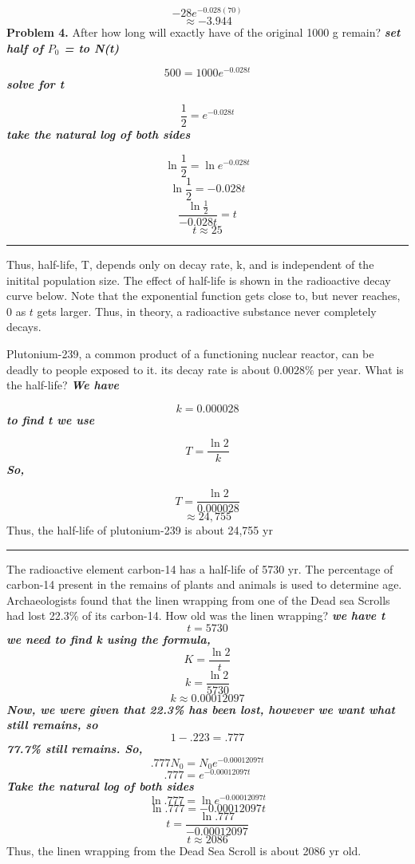 \documentclass{report}
\begin{document}
$$ -28e^{-0.028(70)}$$
$$ \approx -3.944$$
\bigbreak \noindent
\textbf{Problem 4.} After how long will exactly have of the original 1000 g remain?
\bigbreak \noindent
\textit{\textbf{set half of $P_0$ = to N(t)}}

$$ 500 = 1000e^{-0.028t}$$
\textit{\textbf{solve for t}}

$$ \frac{1}{2} = e^{-0.028t}$$
\textit{\textbf{take the natural log of both sides}}

$$ \ln\frac{1}{2} = \ln{e^{-0.028t}}$$
$$ \ln\frac{1}{2} = -0.028t$$
$$ \frac{\ln\frac{1}{2}}{-0.028t} = t$$
$$ t \approx 25$$
\bigbreak \noindent
\hrule
\bigbreak \noindent
{}
\bigbreak \noindent
\begin{minipage}{0.5\textwidth}
Thus, half-life, T, depends only on decay rate, k, and is independent of the initital population size. The effect of half-life is shown in the radioactive decay curve below. Note that the exponential function gets close to, but never reaches, 0 as $t$ gets larger. Thus, in theory, a radioactive substance never completely decays.
\end{minipage}
\begin{minipage}{0.5\textwidth}
\end{minipage}

\pagebreak
\q
Plutonium-239, a common product of a functioning nuclear reactor, can be deadly to people exposed to it. its decay rate is about $0.0028\%$ per year. What is the half-life?
\bigbreak \noindent
\textit{\textbf{We have}}

$$ k = 0.000028$$
\textit{\textbf{to find t we use}}

$$ T = \dfrac{\ln{2}}{k}$$
\textit{\textbf{So,}}

$$ T = \dfrac{\ln{2}}{0.000028}$$
$$ \approx 24,755$$
\bigbreak \noindent
Thus, the half-life of plutonium-239 is about 24,755 yr
\bigbreak \noindent
\hrule
\bigbreak \noindent
\q
The radioactive element carbon-14 has a half-life of 5730 yr. The percentage of carbon-14 present in the remains of plants and animals is used to determine age. Archaeologists found that the linen wrapping from one of the Dead sea Scrolls had lost 22.3\% of its carbon-14. How old was the linen wrapping?
\bigbreak \noindent
\textit{\textbf{we have t}}
$$ t = 5730$$
\textit{\textbf{we need to find k using the formula,}}
$$ K = \dfrac{\ln{2}}{t}$$
$$ k = \dfrac{\ln{2}}{5730}$$
$$ k \approx 0.00012097$$
\textit{\textbf{Now, we were given that 22.3\% has been lost, however we want what still remains, so}}
$$ 1 - .223 = .777$$
\textit{\textbf{77.7\% still remains. So, }}
$$ .777N_0 = N_0e^{-0.00012097t}$$
$$ .777 = e^{-0.00012097t}$$
\textit{\textbf{Take the natural log of both sides}}
$$ \ln{.777} = \ln{e^{-0.00012097t}}$$
$$ \ln{.777} = -0.00012097t$$ 
$$ t = \dfrac{\ln{.777}}{-0.00012097}$$
$$ t \approx 2086$$
\bigbreak \noindent
Thus, the linen wrapping from the Dead Sea Scroll is about 2086 yr old.
\end{document}
